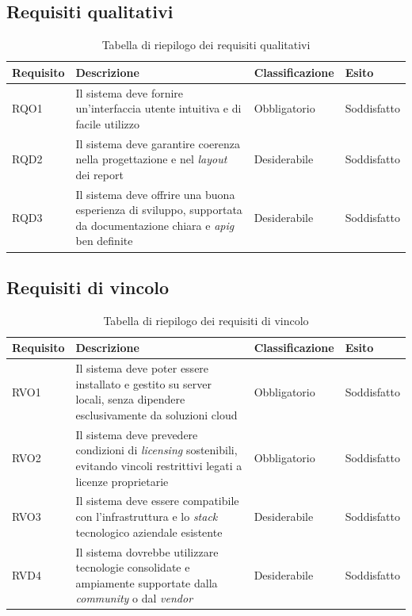\subsection{Requisiti qualitativi}
\begin{table}[H]%
            \caption{Tabella di riepilogo dei requisiti qualitativi}
            \label{tab:requisiti-qualitativi-conclusioni}
            \begin{tabularx}{\textwidth}{|lXll|}
            \hline\hline
            \rowcolor{gray!40}
            \textbf{Requisito} & \textbf{Descrizione} & \textbf{Classificazione} & \textbf{Esito}\\
            \hline
            RQO1    & Il sistema deve fornire un'interfaccia utente intuitiva e di facile utilizzo & Obbligatorio & Soddisfatto\\
            \hline
            RQD2    & Il sistema deve garantire coerenza nella progettazione e nel \emph{layout} dei report & Desiderabile & Soddisfatto\\
            \hline
            RQD3    & Il sistema deve offrire una buona esperienza di sviluppo, supportata da documentazione chiara e \emph{\gls{apig}} ben definite & Desiderabile & Soddisfatto\\
            \hline
            \end{tabularx}
        \end{table}%

\subsection{Requisiti di vincolo}
\begin{table}[H]%
            \caption{Tabella di riepilogo dei requisiti di vincolo}
            \label{tab:requisiti-vincolo-conclusioni}
            \begin{tabularx}{\textwidth}{|lXll|}
            \hline\hline
            \rowcolor{gray!40}
            \textbf{Requisito} & \textbf{Descrizione} & \textbf{Classificazione} & \textbf{Esito}\\
            \hline
            RVO1    & Il sistema deve poter essere installato e gestito su server locali, senza dipendere esclusivamente da soluzioni cloud & Obbligatorio & Soddisfatto\\
            \hline
            RVO2    & Il sistema deve prevedere condizioni di \emph{licensing} sostenibili, evitando vincoli restrittivi legati a licenze proprietarie & Obbligatorio & Soddisfatto\\
            \hline
            RVO3    & Il sistema deve essere compatibile con l'infrastruttura e lo \emph{stack} tecnologico aziendale esistente & Desiderabile & Soddisfatto\\
            \hline
            RVD4    & Il sistema dovrebbe utilizzare tecnologie consolidate e ampiamente supportate dalla \emph{community} o dal \emph{vendor} & Desiderabile & Soddisfatto\\
            \hline
            \end{tabularx}
        \end{table}%
